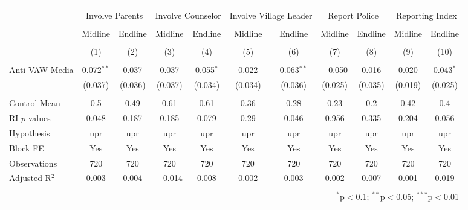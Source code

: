 
\begin{tabular}{@{\extracolsep{5pt}}lcccccccccc} 
\\[-1.8ex]\hline 
\hline \\[-1.8ex] 
 & \multicolumn{2}{c}{Involve Parents} & \multicolumn{2}{c}{Involve Counselor} & \multicolumn{2}{c}{Involve Village Leader} & \multicolumn{2}{c}{Report Police} & \multicolumn{2}{c}{Reporting Index} \\ 
\\[-1.8ex] & Midline & Endline & Midline & Endline & Midline & Endline & Midline & Endline & Midline & Endline \\ 
\\[-1.8ex] & (1) & (2) & (3) & (4) & (5) & (6) & (7) & (8) & (9) & (10)\\ 
\hline \\[-1.8ex] 
 Anti-VAW Media & 0.072$^{**}$ & 0.037 & 0.037 & 0.055$^{*}$ & 0.022 & 0.063$^{**}$ & $-$0.050 & 0.016 & 0.020 & 0.043$^{*}$ \\ 
  & (0.037) & (0.036) & (0.037) & (0.034) & (0.034) & (0.036) & (0.025) & (0.035) & (0.019) & (0.025) \\ 
 \hline \\[-1.8ex] 
Control Mean & 0.5 & 0.49 & 0.61 & 0.61 & 0.36 & 0.28 & 0.23 & 0.2 & 0.42 & 0.4 \\ 
RI $p$-values & 0.048 & 0.187 & 0.185 & 0.079 & 0.29 & 0.046 & 0.956 & 0.335 & 0.204 & 0.056 \\ 
Hypothesis & upr & upr & upr & upr & upr & upr & upr & upr & upr & upr \\ 
Block FE & Yes & Yes & Yes & Yes & Yes & Yes & Yes & Yes & Yes & Yes \\ 
Observations & 720 & 720 & 720 & 720 & 720 & 720 & 720 & 720 & 720 & 720 \\ 
Adjusted R$^{2}$ & 0.003 & 0.004 & $-$0.014 & 0.008 & 0.002 & 0.003 & 0.002 & 0.007 & 0.001 & 0.019 \\ 
\hline 
\hline \\[-1.8ex] 
\multicolumn{11}{r}{$^{*}$p$<$0.1; $^{**}$p$<$0.05; $^{***}$p$<$0.01} \\ 
\end{tabular} 
